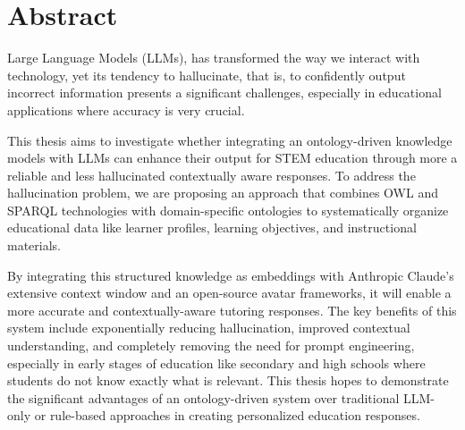
\section*{Abstract}

Large Language Models (LLMs), has transformed the way we interact with technology, 
yet its tendency to hallucinate, that is, to confidently output incorrect information presents a significant challenges, especially in educational applications 
where accuracy is very crucial.

This thesis aims to investigate whether integrating an ontology-driven knowledge models with LLMs can enhance their output for STEM education through more a 
reliable and less hallucinated contextually aware responses. To address the hallucination problem, we are proposing an approach that combines OWL and SPARQL technologies 
with domain-specific ontologies to systematically organize educational data like learner profiles, learning objectives, and instructional materials.

By integrating this structured knowledge as embeddings with Anthropic Claude's extensive context window and an open-source avatar frameworks, 
it will enable a more accurate and contextually-aware tutoring responses. The key benefits of this system include exponentially reducing hallucination, 
improved contextual understanding, and completely removing the need for prompt engineering, especially in early stages of education like secondary and high schools where students do not
know exactly what is relevant. This thesis hopes to demonstrate the significant advantages of an ontology-driven system over traditional LLM-only or rule-based approaches in creating personalized education responses.

\newpage 
